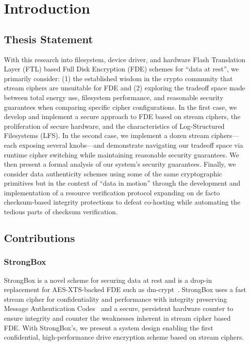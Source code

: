 \chapter{Introduction} \label{chp:introduction}

\section{Thesis Statement}

With this research into filesystem, device driver, and hardware Flash
Translation Layer (FTL) based Full Disk Encryption (FDE) schemes for ``data at
rest'', we primarily consider: (1) the established wisdom in the crypto
community that stream ciphers are unsuitable for FDE and (2) exploring the
tradeoff space made between total energy use, filesystem performance, and
reasonable security guarantees when comparing specific cipher configurations. In
the first case, we develop and implement a secure approach to FDE based on
stream ciphers, the proliferation of secure hardware, and the characteristics of
Log-Structured Filesystems (LFS). In the second case, we implement a dozen
stream ciphers---each exposing several knobs---and demonstrate navigating our
tradeoff space via runtime cipher switching while maintaining reasonable
security guarantees. We then present a formal analysis of our system's security
guarantees. Finally, we consider data authenticity schemes using some of the
same cryptographic primitives but in the context of ``data in motion'' through
the development and implementation of a resource verification protocol expanding
on de facto checksum-based integrity protections to defeat co-hosting while
automating the tedious parts of checksum verification.

\section{Contributions}

\subsection{StrongBox}

StrongBox is a novel scheme for securing data at rest and is a drop-in
replacement for AES-XTS-backed FDE such as dm-crypt~\cite{dmcrypt}. StrongBox
uses a fast stream cipher for confidentiality and performance with integrity
preserving Message Authentication Codes~\cite{MAC} and a secure, persistent
hardware counter to ensure integrity and counter the weaknesses inherent in
stream cipher based FDE. With StrongBox's, we present a system design enabling
the first confidential, high-performance drive encryption scheme based on stream
ciphers.

